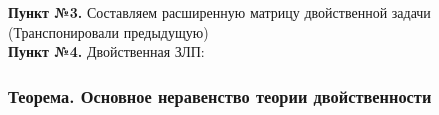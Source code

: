 \textbf{Пункт №3.} Составляем расширенную матрицу двойственной задачи (Транспонировали предыдущую)\\
\textbf{Пункт №4.} Двойственная ЗЛП:\\
\subsubsection{Теорема. Основное неравенство теории двойственности}